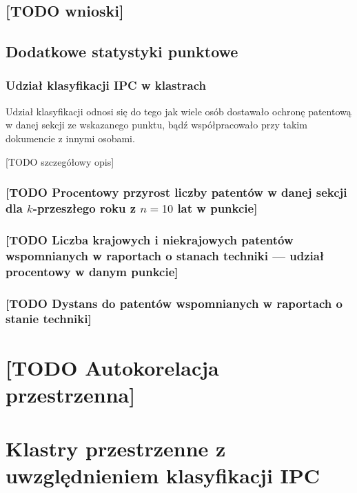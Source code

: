 \subsection{[TODO wnioski]}




    \newpage\subsection
  {Dodatkowe statystyki punktowe}

  \subsubsection
{Udział klasyfikacji \ac{IPC} w klastrach}\label{udział-klasyfikacji}
Udział klasyfikacji odnosi się do tego jak wiele osób dostawało 
ochronę patentową w danej sekcji ze wskazanego punktu, 
bądź współpracowało przy takim dokumencie z innymi osobami.

[TODO szczegółowy opis]

  \subsubsection
{[TODO Procentowy przyrost liczby patentów w danej sekcji 
  dla $k$-przeszłego roku z $n=10$ lat w punkcie]}\label{przyrost-patentów}

  \subsubsection
{[TODO Liczba krajowych i niekrajowych patentów wspomnianych
  w raportach o stanach techniki --- udział procentowy w danym punkcie]}\label{rprt-krajowy}

  \subsubsection
{[TODO Dystans do patentów wspomnianych w raportach 
  o stanie techniki]}\label{rprt-krajowy-dystans}




    \newpage\section
  {[TODO Autokorelacja przestrzenna]}




    \newpage\section
  {Klastry przestrzenne z uwzględnieniem klasyfikacji \ac{IPC}}

